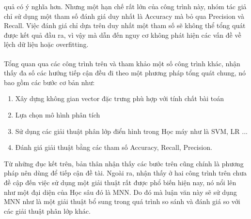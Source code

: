 quả có ý nghĩa hơn. Nhưng một hạn chế rất lớn của công trình này, nhóm tác giả 
chỉ sử dụng một tham số đánh giá duy nhất là Accuracy mà bỏ qua Precision và 
Recall. Việc đánh giá chỉ dựa trên duy nhất một tham số sẽ không thể tổng quát 
được kết quả đầu ra, vì vậy mà dẫn đến nguy cơ không phát hiện các vấn đề về 
lệch dữ liệu hoặc overfitting.\\\\ 
Tổng quan qua các công trình trên và tham khảo một số công trình khác, nhận thấy 
đa số các hướng tiếp cận đều đi theo một phương pháp tổng quát chung, nó bao gồm các bước 
cơ bản như:
\begin{enumerate}
\item Xây dựng không gian vector đặc trưng phù hợp với tính chất bài toán
\item Lựa chọn mô hình phân tích
\item Sử dụng các giải thuật phân lớp điển hình trong Học máy như là 
SVM, LR ...
\item Đánh giá giải thuật bằng các tham số Accuracy, Recall, Precision.
\end{enumerate}
Từ những đục kết trên, bản thân nhận thấy các bước trên cũng chính là phương pháp 
nên dùng để tiếp cận đề tài. Ngoài ra, nhận thấy ở hai công trình trên chưa đề 
cập đến việc sử dụng một giải thuật rất được phổ biến hiện nay, nó nổi lên như 
một đại diện của Học sâu đó là MNN. Do đó mà luận văn này sẽ sử dụng MNN như là 
một giải thuật bổ sung trong quá trình so sánh và đánh giá so với các giải thuật 
phân lớp khác.